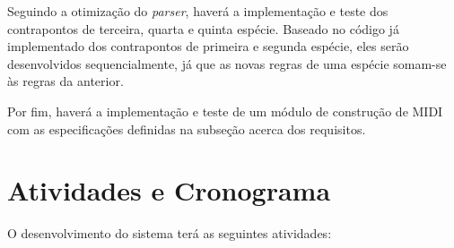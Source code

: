     Seguindo a otimização do \textit{parser}, haverá a implementação e teste dos contrapontos de terceira, quarta e quinta espécie. Baseado no código já implementado dos contrapontos de primeira e segunda espécie, eles serão desenvolvidos sequencialmente, já que as novas regras de uma espécie somam-se às regras da anterior.

    Por fim, haverá a implementação e teste de um módulo de construção de MIDI com as especificações definidas na subseção acerca dos requisitos.

  \section[Atividades e Cronograma]{Atividades e Cronograma}

  O desenvolvimento do sistema terá as seguintes atividades:

